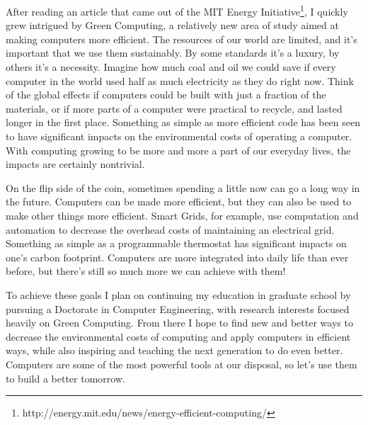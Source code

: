 \documentclass{article}
\begin{document}
After reading an article that came out of the MIT Energy Initiative\footnote{http://energy.mit.edu/news/energy-efficient-computing/}, I quickly grew intrigued by Green Computing, a relatively new area of study aimed at making computers more efficient. The resources of our world are limited, and it's important that we use them sustainably. By some standards it's a luxury, by others it's a necessity. Imagine how much coal and oil we could save if every computer in the world used half as much electricity as they do right now. Think of the global effects if computers could be built with just a fraction of the materials, or if more parts of a computer were practical to recycle, and lasted longer in the first place. Something as simple as more efficient code has been seen to have significant impacts on the environmental costs of operating a computer. With computing growing to be more and more a part of our everyday lives, the impacts are certainly nontrivial. 

On the flip side of the coin, sometimes spending a little now can go a long way in the future. Computers can be made more efficient, but they can also be used to make other things more efficient. Smart Grids, for example, use computation and automation to decrease the overhead costs of maintaining an electrical grid. Something as simple as a programmable thermostat has significant impacts on one's carbon footprint. Computers are more integrated into daily life than ever before, but there's still so much more we can achieve with them!

To achieve these goals I plan on continuing my education in graduate school by pursuing a Doctorate in Computer Engineering, with research interests focused heavily on Green Computing. From there I hope to find new and better ways to decrease the environmental costs of computing and apply computers in efficient ways, while also inspiring and teaching the next generation to do even better. Computers are some of the most powerful tools at our disposal, so let's use them to build a better tomorrow.


\end{document}
